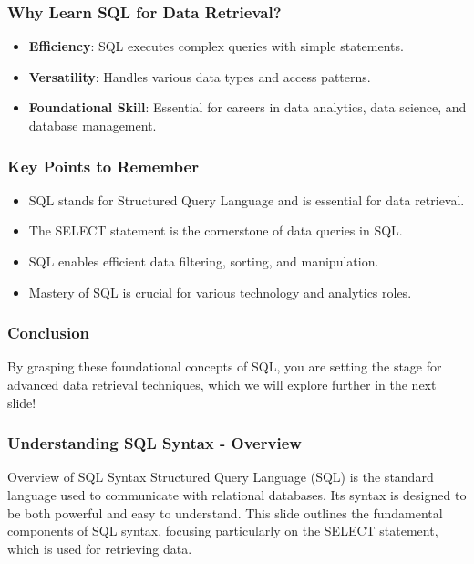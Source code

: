 \documentclass[aspectratio=169]{beamer}
\begin{document}
\begin{frame}[fragile]
    \frametitle{Why Learn SQL for Data Retrieval?}
    \begin{itemize}
        \item \textbf{Efficiency}: SQL executes complex queries with simple statements.
        \item \textbf{Versatility}: Handles various data types and access patterns.
        \item \textbf{Foundational Skill}: Essential for careers in data analytics, data science, and database management.
    \end{itemize}
\end{frame}

\begin{frame}[fragile]
    \frametitle{Key Points to Remember}
    \begin{itemize}
        \item SQL stands for Structured Query Language and is essential for data retrieval.
        \item The SELECT statement is the cornerstone of data queries in SQL.
        \item SQL enables efficient data filtering, sorting, and manipulation.
        \item Mastery of SQL is crucial for various technology and analytics roles.
    \end{itemize}
\end{frame}


\begin{frame}[fragile]
    \frametitle{Conclusion}
    By grasping these foundational concepts of SQL, you are setting the stage for advanced data retrieval techniques, which we will explore further in the next slide!
\end{frame}

\begin{frame}[fragile]
    \frametitle{Understanding SQL Syntax - Overview}
    \begin{block}{Overview of SQL Syntax}
        Structured Query Language (SQL) is the standard language used to communicate with relational databases. Its syntax is designed to be both powerful and easy to understand. This slide outlines the fundamental components of SQL syntax, focusing particularly on the SELECT statement, which is used for retrieving data.
    \end{block}
\end{frame}
\end{document}
